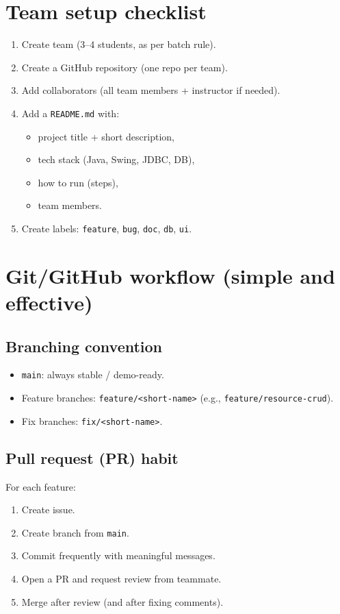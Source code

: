 \documentclass[11pt]{article}
\begin{document}
\section{Team setup checklist}
\begin{enumerate}
  \item Create team (3--4 students, as per batch rule).
  \item Create a GitHub repository (one repo per team).
  \item Add collaborators (all team members + instructor if needed).
  \item Add a \texttt{README.md} with:
  \begin{itemize}
    \item project title + short description,
    \item tech stack (Java, Swing, JDBC, DB),
    \item how to run (steps),
    \item team members.
  \end{itemize}
  \item Create labels: \texttt{feature}, \texttt{bug}, \texttt{doc}, \texttt{db}, \texttt{ui}.
\end{enumerate}

\section{Git/GitHub workflow (simple and effective)}
\subsection{Branching convention}
\begin{itemize}
  \item \texttt{main}: always stable / demo-ready.
  \item Feature branches: \texttt{feature/<short-name>} (e.g., \texttt{feature/resource-crud}).
  \item Fix branches: \texttt{fix/<short-name>}.
\end{itemize}

\subsection{Pull request (PR) habit}
For each feature:
\begin{enumerate}
  \item Create issue.
  \item Create branch from \texttt{main}.
  \item Commit frequently with meaningful messages.
  \item Open a PR and request review from teammate.
  \item Merge after review (and after fixing comments).
\end{enumerate}
\end{document}

